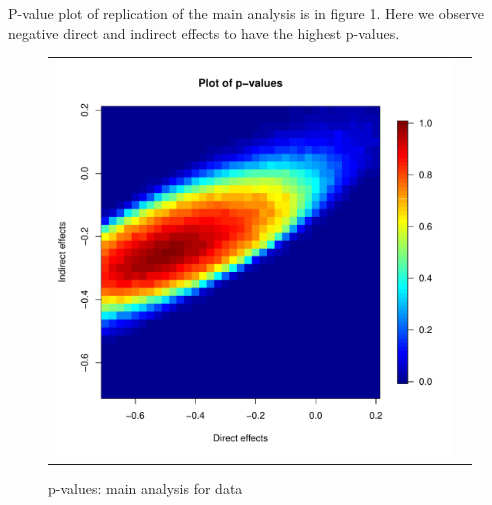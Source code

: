 \documentclass[12pt]{article}
\begin{document}
P-value plot of replication of the main analysis is in figure 1. Here we observe negative direct and indirect effects to have the highest p-values.
\begin{figure}
	\centering
	\begin{tabular}{cc}
	\includegraphics[scale=0.5]{./images/pvalues_figure_Coppock.pdf}
	\end{tabular}
	\caption{p-values: main analysis for \citet{butler2011can} data}
\end{figure}
\end{document}
